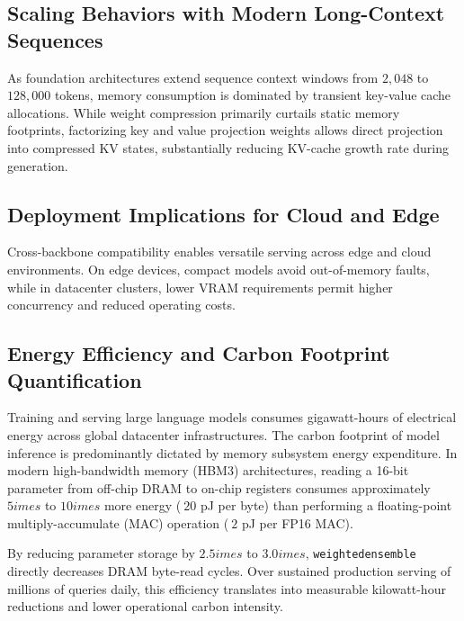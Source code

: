 \subsection{Scaling Behaviors with Modern Long-Context Sequences}
As foundation architectures extend sequence context windows from $2{,}048$ to $128{,}000$ tokens, memory consumption is dominated by transient key-value cache allocations. While weight compression primarily curtails static memory footprints, factorizing key and value projection weights allows direct projection into compressed KV states, substantially reducing KV-cache growth rate during generation.

\subsection{Deployment Implications for Cloud and Edge}
Cross-backbone compatibility enables versatile serving across edge and cloud environments. On edge devices, compact models avoid out-of-memory faults, while in datacenter clusters, lower VRAM requirements permit higher concurrency and reduced operating costs.

\subsection{Energy Efficiency and Carbon Footprint Quantification}
Training and serving large language models consumes gigawatt-hours of electrical energy across global datacenter infrastructures. The carbon footprint of model inference is predominantly dictated by memory subsystem energy expenditure. In modern high-bandwidth memory (HBM3) architectures, reading a 16-bit parameter from off-chip DRAM to on-chip registers consumes approximately $5	imes$ to $10	imes$ more energy ($~20$ pJ per byte) than performing a floating-point multiply-accumulate (MAC) operation ($~2$ pJ per FP16 MAC).

By reducing parameter storage by $2.5	imes$ to $3.0	imes$, \texttt{weightedensemble} directly decreases DRAM byte-read cycles. Over sustained production serving of millions of queries daily, this efficiency translates into measurable kilowatt-hour reductions and lower operational carbon intensity.
